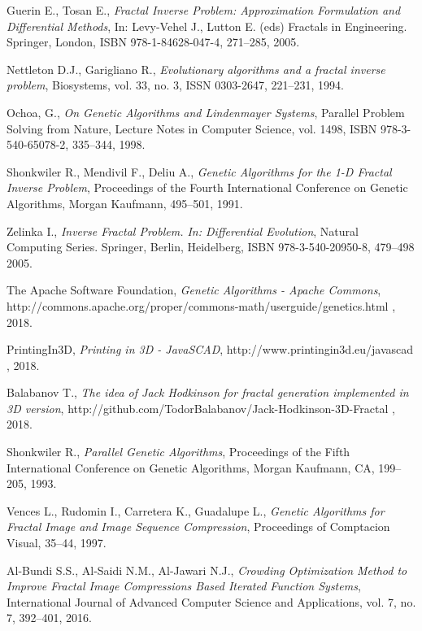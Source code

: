 \documentclass{llncs}
\begin{document}
\begin{thebibliography}{99}

 Guerin E., Tosan E., \textit{Fractal Inverse Problem: Approximation Formulation and Differential Methods}, In: Levy-Vehel J., Lutton E. (eds) Fractals in Engineering. Springer, London, ISBN 978-1-84628-047-4, 271--285, 2005.

 Nettleton D.J., Garigliano R., \textit{Evolutionary algorithms and a fractal inverse problem}, Biosystems, vol. 33, no. 3, ISSN 0303-2647, 221--231, 1994.

 Ochoa, G., \textit{On Genetic Algorithms and Lindenmayer Systems}, Parallel Problem Solving from Nature, Lecture Notes in Computer Science, vol. 1498, ISBN 978-3-540-65078-2, 335--344, 1998.

 Shonkwiler R., Mendivil F., Deliu A., \textit{Genetic Algorithms for the 1-D Fractal Inverse Problem}, Proceedings of the Fourth International Conference on Genetic Algorithms, Morgan Kaufmann, 495--501, 1991.

 Zelinka I., \textit{Inverse Fractal Problem. In: Differential Evolution}, Natural Computing Series. Springer, Berlin, Heidelberg, ISBN 978-3-540-20950-8, 479--498 2005.

 The Apache Software Foundation, \textit{Genetic Algorithms - Apache Commons}, http://commons.apache.org/proper/commons-math/userguide/genetics.html , 2018.

 PrintingIn3D, \textit{Printing in 3D - JavaSCAD}, http://www.printingin3d.eu/javascad , 2018.

 Balabanov T., \textit{The idea of Jack Hodkinson for fractal generation implemented in 3D version}, http://github.com/TodorBalabanov/Jack-Hodkinson-3D-Fractal , 2018.

 Shonkwiler R., \textit{Parallel Genetic Algorithms}, Proceedings of the Fifth International Conference on Genetic Algorithms, Morgan Kaufmann, CA, 199--205, 1993.

 Vences L., Rudomin I., Carretera K., Guadalupe L., \textit{Genetic Algorithms for Fractal Image and Image Sequence Compression},  
Proceedings of Comptacion Visual, 35--44, 1997.

 Al-Bundi S.S., Al-Saidi N.M., Al-Jawari N.J., \textit{Crowding Optimization Method to Improve Fractal Image Compressions Based Iterated Function Systems}, International Journal of Advanced Computer Science and Applications, vol. 7, no. 7, 392--401, 2016.

\end{thebibliography}
\end{document}
